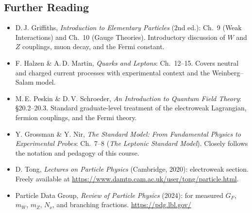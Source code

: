 \begin{furtherreading}
\subsection*{Further Reading}

\begin{itemize}
  \item D.\,J. Griffiths, \textit{Introduction to Elementary Particles} (2nd ed.):
        Ch.~9 (Weak Interactions) and Ch.~10 (Gauge Theories). Introductory
        discussion of $W$ and $Z$ couplings, muon decay, and the Fermi constant.
  \item F. Halzen \& A.\,D. Martin, \textit{Quarks and Leptons}: Ch.~12--15.
        Covers neutral and charged current processes with experimental context and
        the Weinberg--Salam model.
  \item M.\,E. Peskin \& D.\,V. Schroeder, \textit{An Introduction to Quantum
        Field Theory}: \S20.2--20.3. Standard graduate-level treatment of the
        electroweak Lagrangian, fermion couplings, and the Fermi theory.
  \item Y. Grossman \& Y. Nir, \textit{The Standard Model: From Fundamental Physics
        to Experimental Probes}: Ch.~7--8 (\textit{The Leptonic Standard Model}).
        Closely follows the notation and pedagogy of this course.
  \item D. Tong, \textit{Lectures on Particle Physics} (Cambridge, 2020):
        electroweak section. Freely available at
        \url{https://www.damtp.cam.ac.uk/user/tong/particle.html}.
  \item Particle Data Group, \textit{Review of Particle Physics} (2024):
        for measured $G_F$, $m_W$, $m_Z$, $N_\nu$, and branching fractions.
        \url{https://pdg.lbl.gov/}
\end{itemize}
\end{furtherreading}
